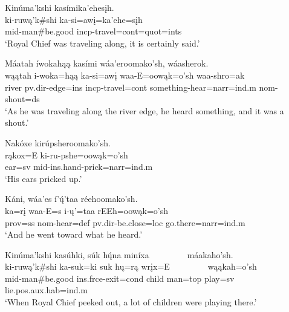 \begin{exe}
\setcounter{xnumi}{0}

\item\label{EJ1} \glll Kinúma'kshi kasímika'ehesįh.\\
ki-ruwą'k\#shi ka-si=awį=ka'ehe=sįh\\
mid-\textnormal{man}\#\textnormal{be.good} incp-\textnormal{travel}=cont=quot=ints\\
\glt `Royal Chief was traveling along, it is certainly said.'

\item\label{EJ2} \glll Máatah íwokahąą kasími wáa'eroomako'sh, wáasherok.\\
wąątah i-woka=hąą ka-si=awį waa-E=oowąk=o'sh waa-shro=ak\\
\textnormal{river} pv.dir-\textnormal{edge}=ins incp-\textnormal{travel}=cont \textnormal{something}-\textnormal{hear}=narr=ind.m nom-\textnormal{shout}=ds\\
\glt `As he was traveling along the river edge, he heard something, and it was a shout.'

\item\label{EJ3} \glll Nakóxe kirúpsheroomako'sh.\\
rąkox=E ki-ru-pshe=oowąk=o'sh\\
\textnormal{ear}=sv mid-ins.hand-\textnormal{prick}=narr=ind.m\\
\glt `His ears pricked up.'

\item\label{EJ4} \glll Káni, wáa'es í'ų́'taa réehoomako'sh.\\
ka=rį waa-E=s i-ų'=taa rEEh=oowąk=o'sh\\
prov=ss nom-\textnormal{hear}=def pv.dir-\textnormal{be.close}=loc \textnormal{go.there}=narr=ind.m\\
\glt `And he went toward what he heard.'

\item\label{EJ5} \glll Kinúma'kshi kasúhki, súk hų́na miníxa ~ ~ ~ ~ ~ máakaho'sh.\\
ki-ruwą'k\#shi ka-suk=ki suk hų=rą wrįx=E ~ ~ ~ ~ ~ wąąkah=o'sh\\
mid-\textnormal{man}\#\textnormal{be.good} ins.frce-\textnormal{exit}=cond \textnormal{child} \textnormal{man}=top \textnormal{play}=sv ~ ~ ~ ~ ~ \textnormal{lie}.pos.aux.hab=ind.m\\
\glt `When Royal Chief peeked out, a lot of children were playing there.'


\end{exe}
